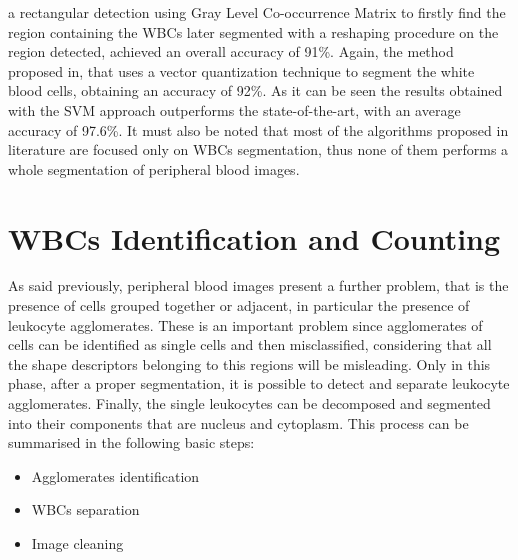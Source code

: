 \documentclass[final,a4paper,12pt,english]{UnicaPhdThesis3}
\begin{document}
a rectangular detection using Gray Level Co-occurrence Matrix to firstly find the region containing the WBCs later segmented with a reshaping procedure on the region detected, achieved an overall accuracy of 91\%. Again, the method proposed in\cite{Kekre}, that uses a vector quantization technique to segment the white blood cells, obtaining an accuracy of 92\%. As it can be seen the results obtained with the SVM approach outperforms the state-of-the-art, with an average accuracy of 97.6\%. It must also be noted that most of the algorithms proposed in literature are focused only on WBCs segmentation, thus none of them performs a whole segmentation of peripheral blood images.
	
	\chapter{WBCs Identification and Counting}
	As said previously, peripheral blood images present a further problem, that is the presence of cells grouped together or adjacent, in particular the presence of leukocyte agglomerates. These is an important problem since agglomerates of cells can be identified as single cells and then misclassified, considering that all the shape descriptors belonging to this regions will be misleading. Only in this phase, after a proper segmentation, it is possible to detect and separate leukocyte agglomerates. Finally, the single leukocytes can be decomposed and segmented into their components that are nucleus and cytoplasm. This process can be summarised in the following basic steps:
	\begin{itemize}
		\item Agglomerates identification 
		\item WBCs separation
		\item Image cleaning
	\end{itemize}
	
\end{document}
